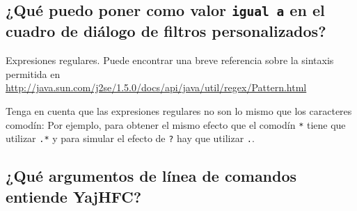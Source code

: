 \documentclass[a4paper,10pt]{scrartcl}
\begin{document}
\subsection{¿Qué puedo poner como valor \texttt{igual a} en el cuadro de diálogo de filtros personalizados? }

Expresiones regulares. Puede encontrar una breve referencia sobre la sintaxis permitida en
\url{http://java.sun.com/j2se/1.5.0/docs/api/java/util/regex/Pattern.html}

Tenga en cuenta que las expresiones regulares no son lo mismo que los caracteres comodín:
Por ejemplo, para obtener el mismo efecto que el comodín \verb.*. tiene que utilizar \verb#.*#
y para simular el efecto de \verb#?# hay que utilizar \verb#.#.

\subsection{¿Qué argumentos de línea de comandos entiende YajHFC?}
\end{document}
